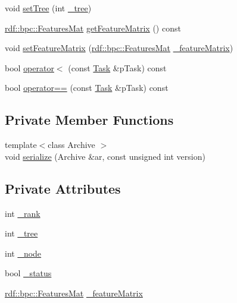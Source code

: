 \begin{DoxyCompactItemize}
void \hyperlink{classrdf_1_1Task_ad7948910883a02524a0975d47c1827a7}{set\+Tree} (int \hyperlink{classrdf_1_1Task_a3986abc1d8a8c79bde8d7525c6faa0bd}{\+\_\+tree})
\item 
\hyperlink{classrdf_1_1bpc_1_1FeaturesMat}{rdf\+::bpc\+::\+Features\+Mat} \hyperlink{classrdf_1_1Task_a2c122a98bbf1eed3f957314b77d4d127}{get\+Feature\+Matrix} () const 
\item 
void \hyperlink{classrdf_1_1Task_a9e2210a4bdaf42a67817e27e2f14765f}{set\+Feature\+Matrix} (\hyperlink{classrdf_1_1bpc_1_1FeaturesMat}{rdf\+::bpc\+::\+Features\+Mat} \hyperlink{classrdf_1_1Task_a05d2cb8251477edc1c869b98a63970fa}{\+\_\+feature\+Matrix})
\item 
bool \hyperlink{classrdf_1_1Task_a17da81a7663395f4d457182a000daed6}{operator$<$} (const \hyperlink{classrdf_1_1Task}{Task} \&p\+Task) const 
\item 
bool \hyperlink{classrdf_1_1Task_a5ce1713364f37d1675b104dc65dd51f4}{operator==} (const \hyperlink{classrdf_1_1Task}{Task} \&p\+Task) const 
\end{DoxyCompactItemize}
\subsection*{Private Member Functions}
\begin{DoxyCompactItemize}
\item 
{\footnotesize template$<$class Archive $>$ }\\void \hyperlink{classrdf_1_1Task_a1e1bfd2786560793c6aa25a91eabca29}{serialize} (Archive \&ar, const unsigned int version)
\end{DoxyCompactItemize}
\subsection*{Private Attributes}
\begin{DoxyCompactItemize}
\item 
int \hyperlink{classrdf_1_1Task_a66806490016907e1acd9ad771811e4d5}{\+\_\+rank}
\item 
int \hyperlink{classrdf_1_1Task_a3986abc1d8a8c79bde8d7525c6faa0bd}{\+\_\+tree}
\item 
int \hyperlink{classrdf_1_1Task_ab505294f64848a3ee104c9efa45528b5}{\+\_\+node}
\item 
bool \hyperlink{classrdf_1_1Task_a43face20dfc0d868ef400070d0fd43bb}{\+\_\+status}
\item 
\hyperlink{classrdf_1_1bpc_1_1FeaturesMat}{rdf\+::bpc\+::\+Features\+Mat} \hyperlink{classrdf_1_1Task_a05d2cb8251477edc1c869b98a63970fa}{\+\_\+feature\+Matrix}
\end{DoxyCompactItemize}
